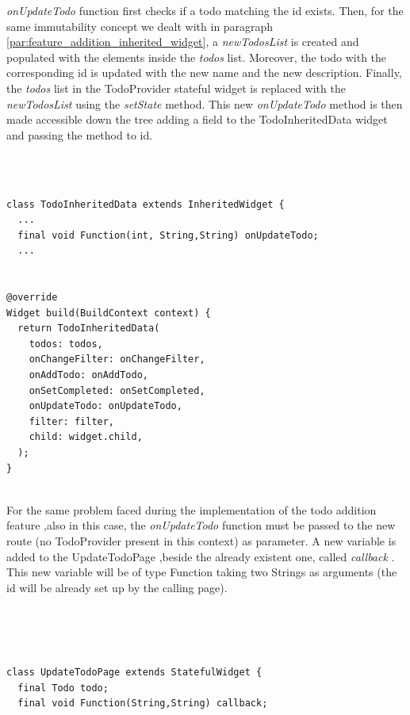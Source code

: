 \textit{onUpdateTodo} function first checks if a todo matching the id exists. Then, for the same immutability concept we dealt with in paragraph \ref{par:feature_addition_inherited_widget}, a \textit{newTodosList }is created and populated with the elements inside the \textit{todos }list. Moreover, the todo with the corresponding id is updated with the new name and the new description. Finally, the \textit{todos }list in the TodoProvider stateful widget is replaced with the \textit{newTodosList }using the \textit{setState} method.
This new \textit{onUpdateTodo} method is then made accessible down the tree adding a field to the TodoInheritedData widget and passing the method to id.
\mbox{}\\
\begin{code}

\mbox{}\\

\begin{verbatim}

class TodoInheritedData extends InheritedWidget {
  ...
  final void Function(int, String,String) onUpdateTodo;
  ...


@override
Widget build(BuildContext context) {
  return TodoInheritedData(
    todos: todos,
    onChangeFilter: onChangeFilter,
    onAddTodo: onAddTodo,
    onSetCompleted: onSetCompleted,
    onUpdateTodo: onUpdateTodo,
    filter: filter,
    child: widget.child,
  );
}
\end{verbatim}
\end{code}
\mbox{}\\
For the same problem faced during the implementation of the todo addition feature ,also in this case, the \textit{onUpdateTodo } function must be passed to the new route (no TodoProvider present in this context) as parameter. A new variable is added to the UpdateTodoPage ,beside the already existent one, called \textit{callback }. This new variable will be of type Function taking two Strings as arguments (the id will be already set up by the calling page).
\begin{code}
\mbox{}\\


\mbox{}\\
\begin{verbatim}

class UpdateTodoPage extends StatefulWidget {
  final Todo todo;
  final void Function(String,String) callback;
 \end{verbatim}
 \end{code}
 \mbox{}\\

